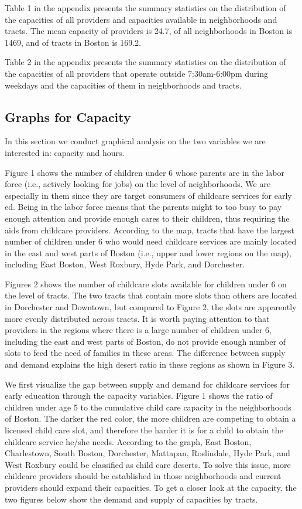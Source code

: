 \documentclass[10pt,letterpaper]{article}
\begin{document}
Table 1 in the appendix presents the summary statistics on the
distribution of the capacities of all providers and capacities available
in neighborhoods and tracts. The mean capacity of providers is 24.7, of
all neighborhoods in Boston is 1469, and of tracts in Boston is 169.2.

Table 2 in the appendix presents the summary statistics on the
distribution of the capacities of all providers that operate outside
7:30am-6:00pm during weekdays and the capacities of them in
neighborhoods and tracts.

\subsection{Graphs for Capacity}\label{graphs-for-capacity}

In this section we conduct graphical analysis on the two variables we
are interested in: capacity and hours.

Figure 1 shows the number of children under 6 whose parents are in the
labor force (i.e., actively looking for jobs) on the level of
neighborhoods. We are especially in them since they are target consumers
of childcare services for early ed. Being in the labor force means that
the parents might to too busy to pay enough attention and provide enough
cares to their children, thus requiring the aids from childcare
providers. According to the map, tracts that have the largest number of
children under 6 who would need childcare services are mainly located in
the east and west parts of Boston (i.e., upper and lower regions on the
map), including East Boston, West Roxbury, Hyde Park, and Dorchester.

Figures 2 shows the number of childcare slots available for children
under 6 on the level of tracts. The two tracts that contain more slots
than others are located in Dorchester and Downtown, but compared to
Figure 2, the slots are apparently more evenly distributed across
tracts. It is worth paying attention to that providers in the regions
where there is a large number of children under 6, including the east
and west parts of Boston, do not provide enough number of slots to feed
the need of families in these areas. The difference between supply and
demand explains the high desert ratio in these regions as shown in
Figure 3.

We first visualize the gap between supply and demand for childcare
services for early education through the capacity variables. Figure 1
shows the ratio of children under age 5 to the cumulative child care
capacity in the neighborhoods of Boston. The darker the red color, the
more children are competing to obtain a licensed child care slot, and
therefore the harder it is for a child to obtain the childcare service
he/she needs. According to the graph, East Boston, Charlestown, South
Boston, Dorchester, Mattapan, Roslindale, Hyde Park, and West Roxbury
could be classified as child care deserts. To solve this issue, more
childcare providers should be established in those neighborhoods and
current providers should expand their capacities. To get a closer look
at the capacity, the two figures below show the demand and supply of
capacities by tracts.
\end{document}
